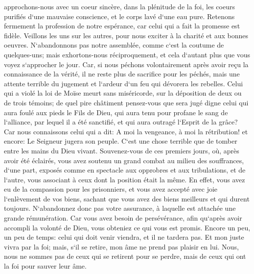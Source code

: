 \verse approchons-nous avec un coeur sincère, dans la plénitude de la foi, les coeurs purifiés d`une mauvaise conscience, et le corps lavé d`une eau pure. 
\verse Retenons fermement la profession de notre espérance, car celui qui a fait la promesse est fidèle. 
\verse Veillons les uns sur les autres, pour nous exciter à la charité et aux bonnes oeuvres. 
\verse N`abandonnons pas notre assemblée, comme c`est la coutume de quelques-uns; mais exhortons-nous réciproquement, et cela d`autant plus que vous voyez s`approcher le jour. 
\verse Car, si nous péchons volontairement après avoir reçu la connaissance de la vérité, il ne reste plus de sacrifice pour les péchés, 
\verse mais une attente terrible du jugement et l`ardeur d`un feu qui dévorera les rebelles. 
\verse Celui qui a violé la loi de Moïse meurt sans miséricorde, sur la déposition de deux ou de trois témoins; 
\verse de quel pire châtiment pensez-vous que sera jugé digne celui qui aura foulé aux pieds le Fils de Dieu, qui aura tenu pour profane le sang de l`alliance, par lequel il a été sanctifié, et qui aura outragé l`Esprit de la grâce? 
\verse Car nous connaissons celui qui a dit: A moi la vengeance, à moi la rétribution! et encore: Le Seigneur jugera son peuple. 
\verse C`est une chose terrible que de tomber entre les mains du Dieu vivant. 
\verse Souvenez-vous de ces premiers jours, où, après avoir été éclairés, vous avez soutenu un grand combat au milieu des souffrances, 
\verse d`une part, exposés comme en spectacle aux opprobres et aux tribulations, et de l`autre, vous associant à ceux dont la position était la même. 
\verse En effet, vous avez eu de la compassion pour les prisonniers, et vous avez accepté avec joie l`enlèvement de vos biens, sachant que vous avez des biens meilleurs et qui durent toujours. 
\verse N`abandonnez donc pas votre assurance, à laquelle est attachée une grande rémunération. 
\verse Car vous avez besoin de persévérance, afin qu`après avoir accompli la volonté de Dieu, vous obteniez ce qui vous est promis. 
\verse Encore un peu, un peu de temps: celui qui doit venir viendra, et il ne tardera pas. 
\verse Et mon juste vivra par la foi; mais, s`il se retire, mon âme ne prend pas plaisir en lui. 
\verse Nous, nous ne sommes pas de ceux qui se retirent pour se perdre, mais de ceux qui ont la foi pour sauver leur âme. 

